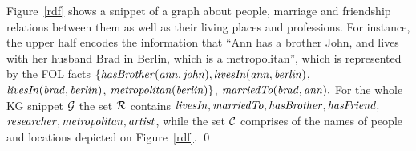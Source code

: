 \begin{example} Figure~\ref{rdf} shows a snippet of a graph about people, marriage and friendship %
relations between them as well as %
their %
living places and professions. For instance, the upper half encodes the information that ``Ann has a brother John, and lives with her husband Brad in Berlin, which is a metropolitan'', which is
represented by the FOL facts $\mathit{\{hasBrother(ann, john),}$$\mathit{ livesIn(ann, berlin)}$, \\$\mathit{livesIn(brad, berlin)}$, $\mathit{metropolitan(berlin)}\}$, $\mathit{marriedTo(brad, ann)}.$
For the whole KG snippet $\mathcal{G}$ the set $\mathcal{R}$ contains $\mathit{livesIn,marriedTo,hasBrother,hasFriend,}$\\$\mathit{researcher,metropolitan,artist}$, while the set $\mathcal{C}$ comprises of the names of people and  locations depicted on Figure~\ref{rdf}. \qed
\end{example}









